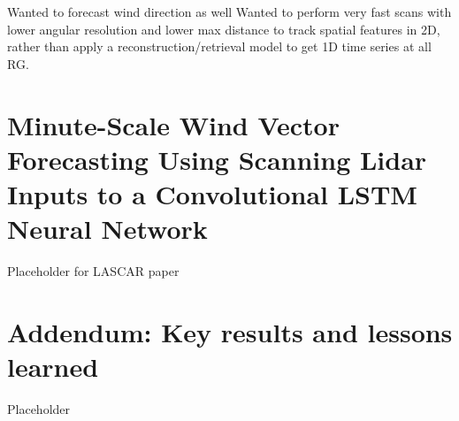 Wanted to forecast wind direction as well
Wanted to perform very fast scans with lower angular resolution and lower max distance to track spatial features in 2D, rather than apply a reconstruction/retrieval model to get 1D time series at all RG.


\clearpage
\section{Minute-Scale Wind Vector Forecasting Using Scanning Lidar Inputs to a Convolutional LSTM Neural Network}
\label{sec:lascar_paper}

Placeholder for LASCAR paper
%

\clearpage
\section{Addendum: Key results and lessons learned}
\label{sec:lascar_addendum}

Placeholder